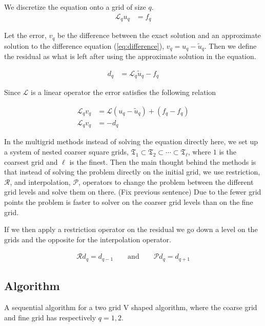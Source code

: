 	We discretize the equation onto a grid of size \(q\).
	\begin{align}
		\mathcal{L}_q u_q &= f_q \label{eq:difference}
	\end{align}

	Let the error, \(v_q\) be the difference between the exact solution and an approximate solution to the difference equation (\ref{eq:difference}), \( v_q = u_q - \tilde{u}_q \). Then we define the residual as what is left after using the approximate solution in the equation.

	\begin{align}
		d_q &= \mathcal{L}_q \tilde{u}_q - f_q
	\end{align}

	Since \(\mathcal{L}\) is a linear operator the error satisfies the following relation

	\begin{align}
		\mathcal{L}_q v_q &= \mathcal{L}(u_q - \tilde{u}_q)  + (f_q- f_q)
		\\
		\mathcal{L}_q v_q &= - d_q \label{eq:diff_MG}
	\end{align}

	In the multigrid methods instead of solving the equation directly here, we set up a system of nested coarser square grids, \(\mathfrak{T}_1 \subset \mathfrak{T}_2 \subset \cdots \subset \mathfrak{T}_\ell\), where \(1\) is the coarsest grid and \(\ell\) is the finest. Then the main thought behind the methods is that instead of solving the problem directly on the initial grid, we use restriction, \( \mathcal{R} \), and interpolation, \( \mathcal{P} \), operators to change the problem between the different grid levels and solve them on there. (Fix previous sentence) Due to the fewer grid points the problem is faster to solver on the coarser grid levels than on the fine grid.

	If we then apply a restriction operator on the residual we go down a level on the grids and the opposite for the interpolation operator.

	\begin{align}
		\mathcal{R} d_q = d_{q-1} \qquad \text{and} \qquad \mathcal{P} d_q = d_{q + 1}
	\end{align}


	\subsection{Algorithm}
		A sequential algorithm for a two grid V shaped algorithm, where the coarse grid and fine grid has respectively \(q = 1,2\).

